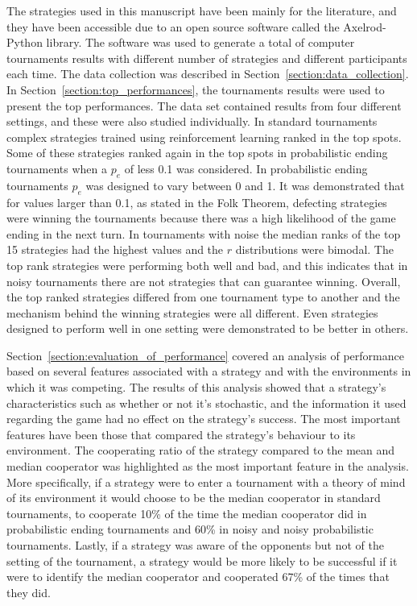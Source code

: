 \documentclass{article}
\newcommand{\numberofalltournaments}{}
\newcommand{\numberofstrategies}{}
\begin{document}
The \numberofstrategies strategies used in this manuscript have been mainly for
the literature, and they have been accessible due to an open source software
called the Axelrod-Python library. The software was used to generate a total of
\numberofalltournaments computer tournaments results with different number of
strategies and different participants each time. The data collection was
described in Section~\ref{section:data_collection}. In
Section~\ref{section:top_performances}, the tournaments results were used to
present the top performances. The data set contained results from four different
settings, and these were also studied individually. In standard tournaments
complex strategies trained using reinforcement learning ranked in the top spots.
Some of these strategies ranked again in the top spots in probabilistic
ending tournaments when a \(p_e\) of less 0.1 was considered. In probabilistic
ending tournaments \(p_e\) was designed to vary between 0 and 1. It was demonstrated
that for values larger than 0.1, as stated in the Folk Theorem, defecting strategies
were winning the tournaments because there was a high likelihood of the game
ending in the next turn. In tournaments with noise the median ranks of the top
15 strategies had the highest values and the \(r\) distributions were bimodal.
The top rank strategies were performing both well and bad, and this indicates
that in noisy tournaments there are not strategies that can guarantee winning.
Overall, the top ranked strategies differed from one tournament type to
another and the mechanism behind the winning strategies were all different.
Even strategies designed to perform well in one setting were demonstrated to be
better in others.

Section~\ref{section:evaluation_of_performance} covered an analysis of
performance based on several features associated with a strategy and with the
environments in which it was competing. The results of this analysis showed that a
strategy's characteristics such as whether or not it's stochastic, and the information it
used regarding the game had no effect on the strategy's success. The most
important features have been those that compared the strategy's behaviour to its
environment. The cooperating ratio of the strategy compared to the mean and
median cooperator was highlighted as the most important feature in the analysis.
More specifically, if a strategy were to enter a tournament with a theory of
mind of its environment it would choose to be the median cooperator in standard
tournaments, to cooperate 10\% of the time the median cooperator did in probabilistic ending tournaments and 
60\% in noisy and noisy probabilistic
tournaments. Lastly, if a strategy was aware of the opponents but not of the
setting of the tournament, a strategy would be more likely to be successful if
it were to identify the median cooperator and cooperated 67\% of the times that
they did.
\end{document}
